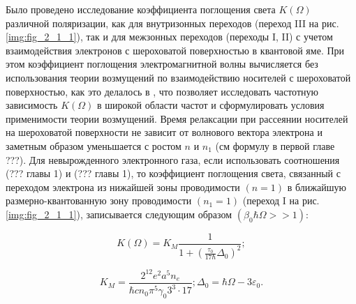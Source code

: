 Было проведено исследование коэффициента поглощения света $K\left(\Omega \right)$ различной поляризации, как для внутризонных переходов (переход III на рис. \ref{img:fig_2_1_1}), так и для межзонных переходов (переходы I, II) с учетом взаимодействия электронов с шероховатой поверхностью в квантовой яме. При этом коэффициент поглощения электромагнитной волны вычисляется без использования теории возмущений по взаимодействию носителей с шероховатой поверхностью, как это делалось в \cite{Vurgaftman1999}, что позволяет исследовать частотную зависимость $K(\Omega)$ в широкой области частот и сформулировать условия применимости теории возмущений.
Время релаксации при рассеянии носителей на шероховатой поверхности не зависит от волнового вектора электрона и заметным образом уменьшается с ростом $n$ и $n_1$ (см формулу в первой главе ???). Для невырожденного электронного газа, если использовать соотношения (??? главы 1) и (??? главы 1), то коэффициент поглощения света, связанный с переходом электрона из нижайшей зоны проводимости $(n=1)$ в ближайшую размерно-квантованную зону проводимости $(n_1=1)$ (переход I на рис. \ref{img:fig_2_1_1}), записывается следующим образом $(\beta _0\hbar \Omega >>1)$:

\begin{equation} \label{eq:21_10}
K \left(\Omega \right)=K_{M} \frac{1}{1+\left(\frac{\tau _{0} }{17\hbar } \Delta _{0} \right)^{2} } ;
\end{equation} 

\[
K_{M} =\frac{2^{12} e^{2} a^{5} n_{e} }{\hbar cn_{0} \pi ^{5} \gamma _{0} 3^{3} \cdot 17} ; \Delta _{0} =\hbar \Omega -3\varepsilon _{0}.
\]

